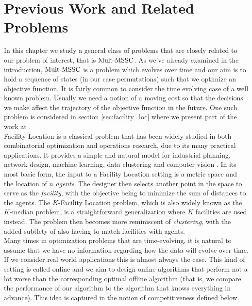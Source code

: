 \chapter{Previous Work and Related Problems}

\noindent
In this chapter we study a general class of problems that are closely related to our problem of interest, that is $\mathrm{Mult}\text{-}\mathrm{MSSC}$. As we've already examined in the introduction, $\mathrm{Mult}\text{-}\mathrm{MSSC}$ is a problem which evolves over time and our aim is to hold a sequence of states (in our case permutations) such that we optimize an objective function. It is fairly common to consider the time evolving case of a well known problem. Usually we need a notion of a moving cost so that the decisions we make affect the trajectory of the objective function in the future. One such problem is considered in section \ref{sec:facility_loc} where we present part of the work at \cite{FOTAKIS202113}. \\

Facility Location is a classical problem that has been widely studied in both combinatorial optimization and operations research, due to its many practical applications. It provides a simple and natural model for industrial planning, network design, machine learning, data clustering and computer vision 
\cite{DH2002,L2011,CGM16,BSU13}. In its most basic form, the input to a Facility Location  setting is a metric space and the location of $n$ \emph{agents}.  The designer then selects another point in the space to serve as the \emph{facility}, with the objective being to minimize the sum of distances to the agents. The $K$-Facility Location  problem, which is also widely known as the $K$-median problem, is a straightforward generalization where $K$ facilities are used instead. The problem then becomes more reminiscent of \emph{clustering}, with the added subtlety of also having to match facilities with agents. \\

Many times in optimization problems that are time-evolving, it is natural to assume that we have no information regarding how the data will evolve over time. If we consider real world applications this is almost always the case. This kind of setting is called online and we aim to design online algorithms that perform not a lot worse than the corresponding optimal offline algorithm (that is, we compare the performance of our algorithm to the algorithm that knows everything in advance). This idea is captured in the notion of competitiveness defined below. \\

